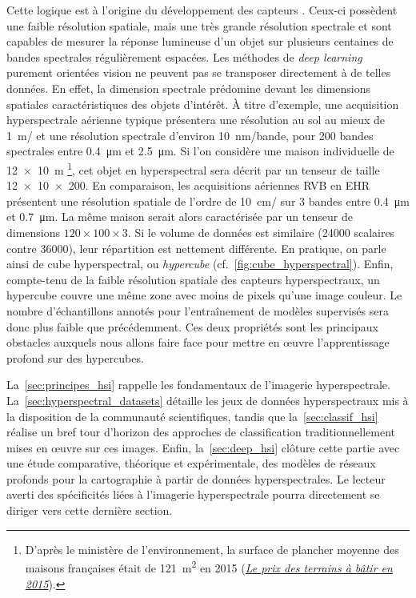 Cette logique est à l'origine du développement des capteurs . Ceux-ci possèdent une faible résolution spatiale, mais une très grande résolution spectrale et sont capables de mesurer la réponse lumineuse d'un objet sur plusieurs centaines de bandes spectrales régulièrement espacées. Les méthodes de \emph{deep learning} purement orientées vision ne peuvent pas se transposer directement à de telles données. En effet, la dimension spectrale prédomine devant les dimensions spatiales caractéristiques des objets d'intérêt. À titre d'exemple, une acquisition hyperspectrale aérienne typique présentera une résolution au sol au mieux de \SI{1}{\meter/\px} et une résolution spectrale d'environ \SI{10}{\nano\meter/bande}, pour 200 bandes spectrales entre \SI{0,4}{\micro\meter} et \SI{2,5}{\micro\meter}. Si l'on considère une maison individuelle de \SI{12x10}{\meter} \footnote{D'après le ministère de l'environnement, la surface de plancher moyenne des maisons françaises était de \SI{121}{\meter\squared} en 2015 (\href{http://www.cohesion-territoires.gouv.fr/IMG/pdf/datalab-essentiel-51-le-prix-des-terrains-a-batir-en-2015-oct2016.pdf}{\og \emph{Le prix des terrains à bâtir en 2015\fg}}).}, cet objet en hyperspectral sera décrit par un tenseur de taille \num{12x10x200}.
En comparaison, les acquisitions aériennes \gls{RVB} en \gls{EHR} présentent une résolution spatiale de l'ordre de \SI{10}{\centi\meter/\px} sur 3 bandes entre \SI{0,4}{\micro\meter} et \SI{0,7}{\micro\meter}. La même maison serait alors caractérisée par un tenseur de dimensions $120\times100\times3$. Si le volume de données est similaire (\num{24000} scalaires contre \num{36000}), leur répartition est nettement différente. En pratique, on parle ainsi de cube hyperspectral, ou \emph{hypercube} (cf.~\cref{fig:cube_hyperspectral}). Enfin, compte-tenu de la faible résolution spatiale des capteurs hyperspectraux, un hypercube couvre une même zone avec moins de pixels qu'une image couleur. Le nombre d'échantillons annotés pour l'entraînement de modèles supervisés sera donc plus faible que précédemment. Ces deux propriétés sont les principaux obstacles auxquels nous allons faire face pour mettre en \oe{}uvre l'apprentissage profond sur des hypercubes.

La~\cref{sec:principes_hsi} rappelle les fondamentaux de l'imagerie hyperspectrale. La~\cref{sec:hyperspectral_datasets} détaille les jeux de données hyperspectraux mis à la disposition de la communauté scientifiques, tandis que la~\cref{sec:classif_hsi} réalise un bref tour d'horizon des approches de classification traditionnellement mises en \oe{}uvre sur ces images. Enfin, la~\cref{sec:deep_hsi} clôture cette partie avec une étude comparative, théorique et expérimentale, des modèles de réseaux profonds pour la cartographie à partir de données hyperspectrales. Le lecteur averti des spécificités liées à l'imagerie hyperspectrale pourra directement se diriger vers cette dernière section.

